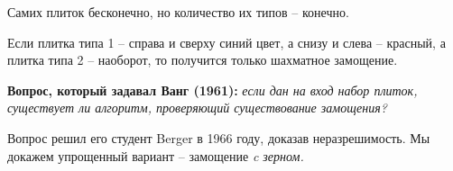 \begin{note}
    Самих плиток бесконечно, но количество их типов -- конечно.
\end{note}

\begin{ex}
    Если плитка типа 1 -- справа и сверху синий цвет, а снизу и слева -- красный, а плитка типа 2 -- наоборот, то получится только шахматное замощение.
\end{ex}

\noindent \textbf{Вопрос, который задавал Ванг (1961):} \textit{если дан на вход набор плиток, существует ли алгоритм, проверяющий существование замощения?}

Вопрос решил его студент Berger в 1966 году, доказав неразрешимость.
Мы докажем упрощенный вариант -- замощение \textit{c зерном.}

